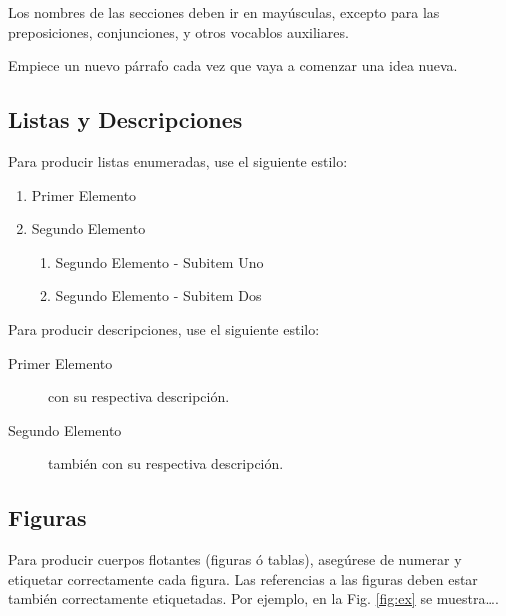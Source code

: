 \documentclass[a4paper,10pt,twocolumn]{article}
\begin{document}
		Los nombres de las secciones deben ir en mayúsculas, excepto para las
		preposiciones, conjunciones, y otros vocablos auxiliares.

		Empiece un nuevo párrafo cada vez que vaya a comenzar una idea nueva.

	\subsection{Listas y Descripciones}\label{sub:lists}
		Para producir listas enumeradas, use el siguiente estilo:

		\begin{enumerate}
			\item Primer Elemento
			\item Segundo Elemento
			\begin {enumerate}
				\item {Segundo Elemento - Subitem Uno}
				\item {Segundo Elemento - Subitem Dos}
			\end {enumerate}
		\end{enumerate}

		Para producir descripciones, use el siguiente estilo:

		\begin{description}
			\item [Primer Elemento] con su respectiva descripción.
			\item [Segundo Elemento] también con su respectiva descripción.
		\end{description}

	\subsection{Figuras}\label{sub:figures}
		Para producir cuerpos flotantes (figuras ó tablas), asegúrese de numerar
		y etiquetar correctamente cada figura. Las referencias a las figuras deben
		estar también correctamente etiquetadas. Por ejemplo, en la Fig. \ref{fig:ex}
		se muestra\ldots.
\end{document}
